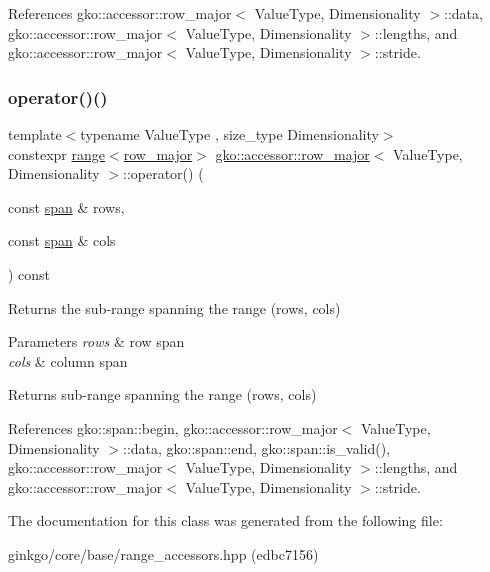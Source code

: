 References gko\+::accessor\+::row\+\_\+major$<$ Value\+Type, Dimensionality $>$\+::data, gko\+::accessor\+::row\+\_\+major$<$ Value\+Type, Dimensionality $>$\+::lengths, and gko\+::accessor\+::row\+\_\+major$<$ Value\+Type, Dimensionality $>$\+::stride.

\mbox{\label{classgko_1_1accessor_1_1row__major_ad1a38f9d96e849ae10de733809a3494d}} 
\subsubsection{\texorpdfstring{operator()()}{operator()()}\hspace{0.1cm}{\footnotesize\ttfamily [2/2]}}
{\footnotesize\ttfamily template$<$typename Value\+Type , size\+\_\+type Dimensionality$>$ \\
constexpr \hyperlink{classgko_1_1range}{range}$<$\hyperlink{classgko_1_1accessor_1_1row__major}{row\+\_\+major}$>$ \hyperlink{classgko_1_1accessor_1_1row__major}{gko\+::accessor\+::row\+\_\+major}$<$ Value\+Type, Dimensionality $>$\+::operator() (\begin{DoxyParamCaption}\item[{const \hyperlink{structgko_1_1span}{span} \&}]{rows,  }\item[{const \hyperlink{structgko_1_1span}{span} \&}]{cols }\end{DoxyParamCaption}) const\hspace{0.3cm}{\ttfamily [inline]}}



Returns the sub-\/range spanning the range (rows, cols) 


\begin{DoxyParams}{Parameters}
{\em rows} & row span \\
\hline
{\em cols} & column span\\
\hline
\end{DoxyParams}
\begin{DoxyReturn}{Returns}
sub-\/range spanning the range (rows, cols) 
\end{DoxyReturn}


References gko\+::span\+::begin, gko\+::accessor\+::row\+\_\+major$<$ Value\+Type, Dimensionality $>$\+::data, gko\+::span\+::end, gko\+::span\+::is\+\_\+valid(), gko\+::accessor\+::row\+\_\+major$<$ Value\+Type, Dimensionality $>$\+::lengths, and gko\+::accessor\+::row\+\_\+major$<$ Value\+Type, Dimensionality $>$\+::stride.



The documentation for this class was generated from the following file\+:\begin{DoxyCompactItemize}
\item 
ginkgo/core/base/range\+\_\+accessors.\+hpp (edbc7156)\end{DoxyCompactItemize}
